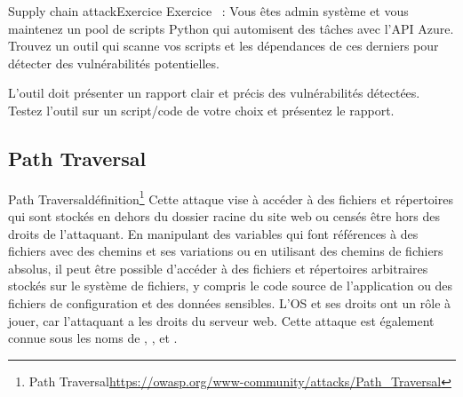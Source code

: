 \documentclass{beamer}
\begin{document}
    \begin{frame}{Supply chain attack}{Exercice}
        Exercice \execcounterdispinc{}~:
        Vous êtes admin système et vous maintenez un pool de scripts Python qui automisent des tâches avec l'API Azure.
        \bigbreak
        Trouvez un outil qui scanne vos scripts et les dépendances de ces derniers pour détecter des vulnérabilités potentielles.

        L'outil doit présenter un rapport clair et précis des vulnérabilités détectées.
        \bigbreak
        Testez l'outil sur un script/code de votre choix et présentez le rapport.
    \end{frame}

    \subsection{Path Traversal}\label{path-traversal}


    \begin{frame}{Path Traversal}{définition\footnote{Path Traversal\url{https://owasp.org/www-community/attacks/Path_Traversal}}}
        Cette attaque vise à accéder à des fichiers et répertoires qui sont stockés en dehors du dossier racine du site web ou censés être hors des droits de l'attaquant.
        En manipulant des variables qui font références à des fichiers avec des chemins  et ses variations ou en utilisant des chemins de fichiers absolus, il peut être possible d'accéder à des fichiers et répertoires arbitraires stockés sur le système de fichiers, y compris le code source de l'application ou des fichiers de configuration et des données sensibles.
        L'OS et ses droits ont un rôle à jouer, car l'attaquant a les droits du serveur web.
        \bigbreak
        Cette attaque est également connue sous les noms de , ,  et .
    \end{frame}
\end{document}
